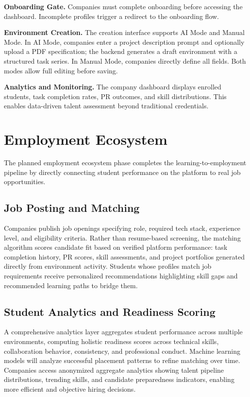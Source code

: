\documentclass[runningheads]{llncs}
\begin{document}
\noindent\textbf{Onboarding Gate.} Companies must complete onboarding before accessing the dashboard. Incomplete profiles trigger a redirect to the onboarding flow.

\noindent\textbf{Environment Creation.} The creation interface supports AI Mode and Manual Mode. In AI Mode, companies enter a project description prompt and optionally upload a PDF specification; the backend generates a draft environment with a structured task series. In Manual Mode, companies directly define all fields. Both modes allow full editing before saving.

\noindent\textbf{Analytics and Monitoring.} The company dashboard displays enrolled students, task completion rates, PR outcomes, and skill distributions. This enables data-driven talent assessment beyond traditional credentials.

\section{Employment Ecosystem}
\label{sec:ecosystem}

The planned employment ecosystem phase completes the learning-to-employment pipeline by directly connecting student performance on the platform to real job opportunities.

\subsection{Job Posting and Matching}

Companies publish job openings specifying role, required tech stack, experience level, and eligibility criteria. Rather than resume-based screening, the matching algorithm scores candidate fit based on verified platform performance: task completion history, PR scores, skill assessments, and project portfolios generated directly from environment activity. Students whose profiles match job requirements receive personalized recommendations highlighting skill gaps and recommended learning paths to bridge them.

\subsection{Student Analytics and Readiness Scoring}

A comprehensive analytics layer aggregates student performance across multiple environments, computing holistic readiness scores across technical skills, collaboration behavior, consistency, and professional conduct. Machine learning models will analyze successful placement patterns to refine matching over time. Companies access anonymized aggregate analytics showing talent pipeline distributions, trending skills, and candidate preparedness indicators, enabling more efficient and objective hiring decisions.
\end{document}
